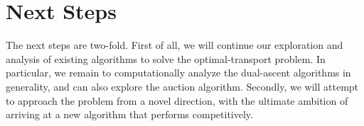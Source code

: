 \documentclass[11pt,reqno]{amsart}
\renewcommand{\b}{\mathbf}
\newcommand{\one}{\mathbbm{1}}
\theoremstyle{definition}
\theoremstyle{remark}
\begin{document}
\section{Next Steps}

The next steps are two-fold. First of all, we will continue our exploration and
analysis of existing algorithms to solve the optimal-transport problem. In
particular, we remain to computationally analyze the dual-ascent algorithms in
generality, and can also explore the auction algorithm. Secondly, we will
attempt to approach the problem from a novel direction, with the ultimate
ambition of arriving at a new algorithm that performs competitively.

 



\end{document}
